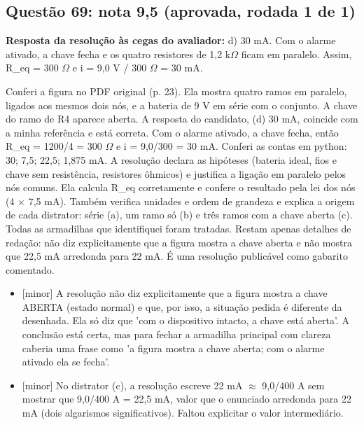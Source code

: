 \documentclass{article}%
\begin{document}
\subsection*{Questão 69: nota 9,5 (aprovada, rodada 1 de 1)}%
\textbf{Resposta da resolução às cegas do avaliador:} d) 30 mA. Com o alarme ativado, a chave fecha e os quatro resistores de 1,2 k$\Omega$ ficam em paralelo. Assim, R\_eq = 300 $\Omega$ e i = 9,0 V / 300 $\Omega$ = 30 mA.\par %
Conferi a figura no PDF original (p. 23). Ela mostra quatro ramos em paralelo, ligados aos mesmos dois nós, e a bateria de 9 V em série com o conjunto. A chave do ramo de R4 aparece aberta. A resposta do candidato, (d) 30 mA, coincide com a minha referência e está correta. Com o alarme ativado, a chave fecha, então R\_eq = 1200/4 = 300 $\Omega$ e i = 9,0/300 = 30 mA. Conferi as contas em python: 30; 7,5; 22,5; 1,875 mA. A resolução declara as hipóteses (bateria ideal, fios e chave sem resistência, resistores ôhmicos) e justifica a ligação em paralelo pelos nós comuns. Ela calcula R\_eq corretamente e confere o resultado pela lei dos nós (4 $\times$ 7,5 mA). Também verifica unidades e ordem de grandeza e explica a origem de cada distrator: série (a), um ramo só (b) e três ramos com a chave aberta (c). Todas as armadilhas que identifiquei foram tratadas. Restam apenas detalhes de redação: não diz explicitamente que a figura mostra a chave aberta e não mostra que 22,5 mA arredonda para 22 mA. É uma resolução publicável como gabarito comentado.%
\begin{itemize}%
\item%
{[}minor{]} A resolução não diz explicitamente que a figura mostra a chave ABERTA (estado normal) e que, por isso, a situação pedida é diferente da desenhada. Ela só diz que 'com o dispositivo intacto, a chave está aberta'. A conclusão está certa, mas para fechar a armadilha principal com clareza caberia uma frase como 'a figura mostra a chave aberta; com o alarme ativado ela se fecha'.%
\item%
{[}minor{]} No distrator (c), a resolução escreve 22 mA $\approx$ 9,0/400 A sem mostrar que 9,0/400 A = 22,5 mA, valor que o enunciado arredonda para 22 mA (dois algarismos significativos). Faltou explicitar o valor intermediário.%
\end{itemize}%
\end{document}
